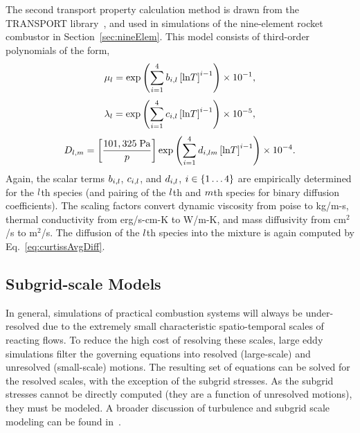 The second transport property calculation method is drawn from the TRANSPORT library~\cite{Kee1998}, and used in simulations of the nine-element rocket combustor in Section~\ref{sec:nineElem}. This model consists of third-order polynomials of the form,
%
\begin{equation}
	\mu_{l} = \text{exp} \left( \sum_{i=1}^4 b_{i,l} \left[\text{ln}T\right]^{i - 1} \right) \times 10^{-1},
\end{equation}
%
\begin{equation}
	\lambda_{l} = \text{exp} \left( \sum_{i=1}^4 c_{i,l} \left[\text{ln}T\right]^{i - 1} \right) \times 10^{-5},
\end{equation}
%
\begin{equation}
	D_{l, m} = \left[\frac{101,325 \; \text{Pa}}{p}\right] \text{exp} \left( \sum_{i=1}^4 d_{i,l m} \left[\text{ln}T\right]^{i - 1} \right) \times 10^{-4}.
\end{equation}
%
Again, the scalar terms $b_{i,l}$, $c_{i,l}$, and $d_{i,l}$, $i \in \{1 \hdots 4\}$ are empirically determined for the $l$th species (and pairing of the $l$th and $m$th species for binary diffusion coefficients). The scaling factors convert dynamic viscosity from poise to kg/m-s, thermal conductivity from erg/s-cm-K to W/m-K, and mass diffusivity from cm$^2$/s to m$^2$/s. The diffusion of the $l$th species into the mixture is again computed by Eq.~\ref{eq:curtissAvgDiff}.

\subsection{Subgrid-scale Models}\label{subsec:subgrid}

In general, simulations of practical combustion systems will always be under-resolved due to the extremely small characteristic spatio-temporal scales of reacting flows. To reduce the high cost of resolving these scales, large eddy simulations filter the governing equations into resolved (large-scale) and unresolved (small-scale) motions. The resulting set of equations can be solved for the resolved scales, with the exception of the subgrid stresses. As the subgrid stresses cannot be directly computed (they are a function of unresolved motions), they must be modeled. A broader discussion of turbulence and subgrid scale modeling can be found in~\cite{Pope2000}.

